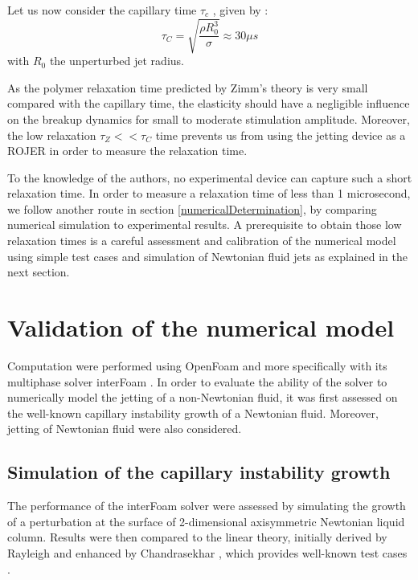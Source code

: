 \documentclass[onecolumn, 12pt]{asme2ej}
\begin{document}
Let us now consider the capillary time $\tau_c$ , given by :
\begin{equation}
    \tau_C= \sqrt{\frac{\rho R_0^3 }{ \sigma}} \approx 30\mu s
\end{equation}
with $R_0$ the unperturbed jet radius. 

As the polymer relaxation time predicted by Zimm's theory is very small compared with the capillary time, the elasticity should have a negligible influence on the breakup dynamics for small to moderate stimulation amplitude. Moreover, the low relaxation $\tau_Z<<\tau_C$ time prevents us from using the jetting device as a ROJER \cite{keshavarz2015studying} in order to measure the relaxation time. 

To the knowledge of the authors, no experimental device can capture such a short relaxation time. In order to measure a relaxation time of less than 1 microsecond, we follow another route in section \ref{numericalDetermination}, by comparing numerical simulation to experimental results. A prerequisite to obtain those low relaxation times is a careful assessment and calibration of the numerical model using simple test cases and simulation of Newtonian fluid jets as explained in the next section.

\section{Validation of the numerical model}
Computation were performed using {OpenFoam\textregistered} and more specifically with its multiphase solver interFoam \cite{deshpande2012evaluating}. In order to evaluate the ability of the solver to numerically model the jetting of a non-Newtonian fluid, it was first assessed on the well-known capillary instability growth of a Newtonian fluid. Moreover, jetting of Newtonian fluid were also considered.

\subsection{Simulation of the capillary instability growth}
The performance of the interFoam solver were assessed by simulating the growth of a perturbation at the surface of 2-dimensional axisymmetric Newtonian liquid column. Results were then compared to the linear theory, initially derived by Rayleigh \cite{rayleigh1892xvi} and enhanced by Chandrasekhar \cite{chandrasekhar2013hydrodynamic}, which provides well-known test cases \cite{delteil2011numerical,cervone2010simulation}.
\end{document}
